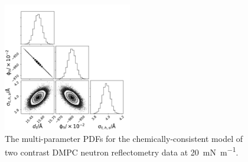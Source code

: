 \documentclass[amsmath,amssymb,superscriptaddress]{revtex4-1}
\begin{document}
\begin{figure}[H]
	\centering
	\includegraphics[width=0.50\textwidth]{figures/dppc_20n_all_corner}
	\caption{The multi-parameter PDFs for the chemically-consistent model of two contrast DMPC neutron reflectometry data at \SI{20}{\milli\newton\per\meter}.}
	\label{fig:dppcn2}
\end{figure}

\end{document}
